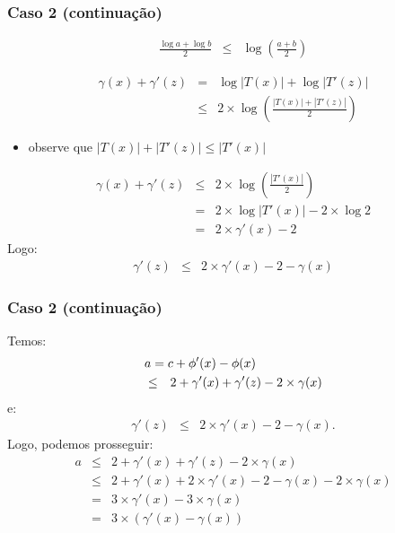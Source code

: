 \documentclass{beamer}
\begin{document}
\begin{frame}
\frametitle{Caso 2 (continuação)}

\begin{eqnarray*}
\frac{\log a + \log b} 2 & \le & \log \left( \frac{a+b}{2} \right)
\end{eqnarray*}

\begin{eqnarray*}
\gamma(x) + \gamma'(z) & = & \log |T(x)| + \log |T'(z)| \\
& \le & 2 \times \log \left( \frac{|T(x)| + |T'(z)|}{2} \right)
\end{eqnarray*}
\begin{itemize}
\item observe que $|T(x)| + |T'(z)| \le |T'(x)|$
\end{itemize}
\begin{eqnarray*}
\gamma(x) + \gamma'(z) & \le & 2 \times \log \left( \frac{|T'(x)|}{2} \right) \\
 & = & 2 \times \log |T'(x)| - 2 \times \log 2 \\
 & = & 2 \times \gamma'(x) - 2
\end{eqnarray*}
Logo:
\begin{eqnarray*}
\gamma'(z) & \le & 2 \times \gamma'(x) - 2 - \gamma(x)
\end{eqnarray*}
\end{frame}

\begin{frame}
\frametitle{Caso 2 (continuação)}

Temos:
\begin{eqnarray*}
\lefteqn{a = c + \phi'(x) - \phi(x)} \\
& \le & 2 + \gamma'(x) + \gamma'(z) - 2 \times \gamma(x)
\end{eqnarray*}
e:
\begin{eqnarray*}
\gamma'(z) & \le & 2 \times \gamma'(x) - 2 - \gamma(x).
\end{eqnarray*}
Logo, podemos prosseguir:
\begin{eqnarray*}
a & \le & 2 + \gamma'(x) + \gamma'(z) - 2 \times \gamma(x) \\
  & \le & 2 + \gamma'(x) + 2 \times \gamma'(x) - 2 - \gamma(x) - 2 \times \gamma(x) \\
  & = & 3 \times \gamma'(x) - 3 \times \gamma(x) \\
  & = & 3 \times (\gamma'(x) - \gamma(x))
\end{eqnarray*}
\end{frame}
\end{document}
